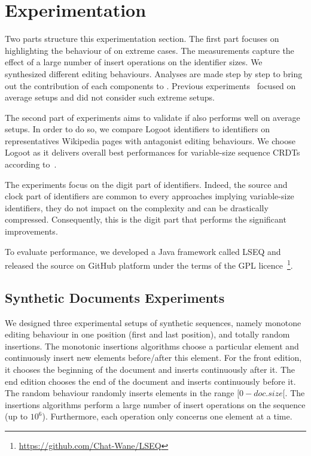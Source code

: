 \section{Experimentation}
\label{sec:validation}

Two parts structure this experimentation section. The first part focuses on
highlighting the behaviour of \NAME{} on extreme cases. The measurements
capture the effect of a large number of insert operations on the identifier
sizes. We synthesized different editing behaviours. Analyses are made step by
step to bring out the contribution of each components to \NAME{}. Previous
experiments~\cite{ahmed2011evaluating,preguica2009commutative,weiss2009logoot}
focused on average setups and did not consider such extreme setups.

The second part of experiments aims to validate if \NAME{} also performs well
on average setups.  In order to do so, we compare Logoot identifiers to \NAME{}
identifiers on representatives Wikipedia pages with antagonist editing
behaviours. We choose Logoot as it delivers overall best performances for
variable-size sequence CRDTs according to~\cite{ahmed2011evaluating}.

The experiments focus on the digit part of identifiers. Indeed, the source and
clock part of identifiers are common to every approaches implying variable-size
identifiers, they do not impact on the complexity and can be drastically
compressed. Consequently, this is the digit part that performs the significant
improvements.

To evaluate \NAME{} performance, we developed a Java framework called LSEQ and
released the source on GitHub platform under the terms of the GPL
licence~\footnote{\url{https://github.com/Chat-Wane/LSEQ}}.

\subsection{Synthetic Documents Experiments}
\label{ssec:components}

We designed three experimental setups of synthetic sequences, namely monotone
editing behaviour in one position (first and last position), and totally random
insertions. The monotonic insertions algorithms choose a particular element and
continuously insert new elements before/after this element. For the front
edition, it chooses the beginning of the document and inserts continuously
after it. The end edition chooses the end of the document and inserts
continuously before it. The random behaviour randomly inserts elements in the
range $[0-doc.size[$. The insertions algorithms perform a large number of
    insert operations on the sequence (up to $10^6$). Furthermore, each
    operation only concerns one element at a time.

